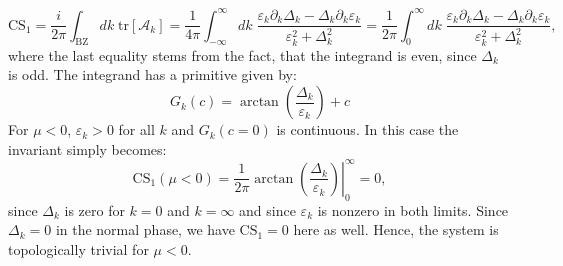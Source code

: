 \begin{equation}
\text{CS}_1 = \frac{i}{2\pi}\int_{\text{BZ}} dk\; \text{tr}\left[\mathcal{A}_k\right] = \frac{1}{4\pi}\int_{-\infty}^{\infty} dk \;  \frac{\varepsilon_k\partial_k\Delta_k - \Delta_k \partial_k \varepsilon_k}{\varepsilon^2_k + \Delta^2_k} = \frac{1}{2\pi}\int_0^\infty dk \; \frac{\varepsilon_k\partial_k\Delta_k - \Delta_k \partial_k \varepsilon_k}{\varepsilon^2_k + \Delta^2_k}, 
\label{eq.CSinv1}
\end{equation}
where the last equality stems from the fact, that the integrand is even, since $\Delta_k$ is odd. The integrand has a primitive given by:
\begin{equation}
G_k(c) = \arctan\left(\frac{\Delta_k}{\varepsilon_k}\right) + c \nonumber
\end{equation}
For $\mu < 0$, $\varepsilon_k > 0$ for all $k$ and $G_k(c = 0)$ is continuous. In this case the invariant simply becomes:
\begin{equation}
\text{CS}_1(\mu < 0) = \left. \frac{1}{2\pi}\arctan\left(\frac{\Delta_k}{\varepsilon_k}\right)\right|_{0}^{\infty} = 0,
\end{equation}
since $\Delta_k$ is zero for $k = 0$ and $k = \infty$ and since $\varepsilon_k$ is nonzero in both limits. Since $\Delta_k = 0$ in the normal phase, we have $\text{CS}_1 = 0$ here as well. Hence, the system is topologically trivial for $\mu < 0$. 

